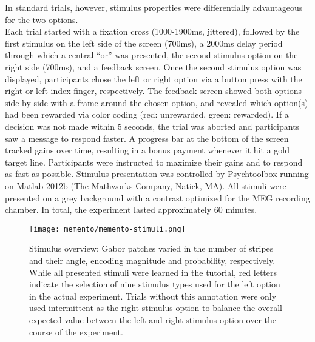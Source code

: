 In standard trials, however, stimulus properties were differentially advantageous for the two options.\\
Each trial started with a fixation cross (1000-1900ms, jittered), followed by the first stimulus on the left side of the screen (700ms), a 2000ms delay period through which a central ``or'' was presented, the second stimulus option on the right side (700ms), and a feedback screen.
Once the second stimulus option was displayed, participants chose the left or right option via a button press with the right or left index finger, respectively.
The feedback screen showed both options side by side with a frame around the chosen option, and revealed which option(s) had been rewarded via color coding (red: unrewarded, green: rewarded).
If a decision was not made within 5 seconds, the trial was aborted and participants saw a message to respond faster.
A progress bar at the bottom of the screen tracked gains over time, resulting in a bonus payment whenever it hit a gold target line.
Participants were instructed to maximize their gains and to respond as fast as possible.
Stimulus presentation was controlled by Psychtoolbox \citep{kleiner2007s} running on Matlab 2012b (The Mathworks Company, Natick, MA).
All stimuli were presented on a grey background with a contrast optimized for the MEG recording chamber.
In total, the experiment lasted approximately 60 minutes.

\begin{figure}
	\centering
	\texttt{[image: memento/memento-stimuli.png]}
	\caption[Stimulus overview]{Stimulus overview: Gabor patches varied in the number of stripes and their angle, encoding magnitude and probability, respectively. While all presented stimuli were learned in the tutorial, red letters indicate the selection of nine stimulus types used for the left option in the actual experiment. Trials without this annotation were only used intermittent as the right stimulus option to balance the overall expected value between the left and right stimulus option over the course of the experiment.}
	\label{fig:memento_stim}
\end{figure}

